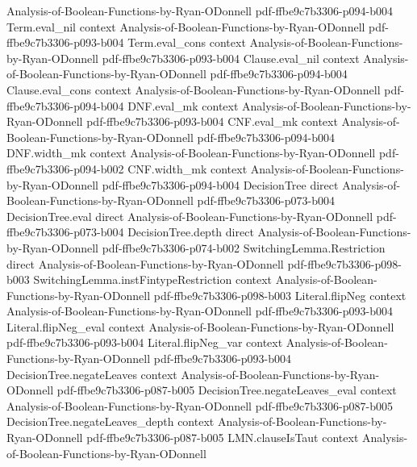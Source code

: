 \begin{lemma}
  {Analysis-of-Boolean-Functions-by-Ryan-ODonnell}
  {pdf-ffbe9c7b3306-p094-b004}
\proofstep
  {Term.eval_nil}
  {context}
  {Analysis-of-Boolean-Functions-by-Ryan-ODonnell}
  {pdf-ffbe9c7b3306-p093-b004}
\proofstep
  {Term.eval_cons}
  {context}
  {Analysis-of-Boolean-Functions-by-Ryan-ODonnell}
  {pdf-ffbe9c7b3306-p093-b004}
\proofstep
  {Clause.eval_nil}
  {context}
  {Analysis-of-Boolean-Functions-by-Ryan-ODonnell}
  {pdf-ffbe9c7b3306-p094-b004}
\proofstep
  {Clause.eval_cons}
  {context}
  {Analysis-of-Boolean-Functions-by-Ryan-ODonnell}
  {pdf-ffbe9c7b3306-p094-b004}
\proofstep
  {DNF.eval_mk}
  {context}
  {Analysis-of-Boolean-Functions-by-Ryan-ODonnell}
  {pdf-ffbe9c7b3306-p093-b004}
\proofstep
  {CNF.eval_mk}
  {context}
  {Analysis-of-Boolean-Functions-by-Ryan-ODonnell}
  {pdf-ffbe9c7b3306-p094-b004}
\proofstep
  {DNF.width_mk}
  {context}
  {Analysis-of-Boolean-Functions-by-Ryan-ODonnell}
  {pdf-ffbe9c7b3306-p094-b002}
\proofstep
  {CNF.width_mk}
  {context}
  {Analysis-of-Boolean-Functions-by-Ryan-ODonnell}
  {pdf-ffbe9c7b3306-p094-b004}
\proofstep
  {DecisionTree}
  {direct}
  {Analysis-of-Boolean-Functions-by-Ryan-ODonnell}
  {pdf-ffbe9c7b3306-p073-b004}
\proofstep
  {DecisionTree.eval}
  {direct}
  {Analysis-of-Boolean-Functions-by-Ryan-ODonnell}
  {pdf-ffbe9c7b3306-p073-b004}
\proofstep
  {DecisionTree.depth}
  {direct}
  {Analysis-of-Boolean-Functions-by-Ryan-ODonnell}
  {pdf-ffbe9c7b3306-p074-b002}
\proofstep
  {SwitchingLemma.Restriction}
  {direct}
  {Analysis-of-Boolean-Functions-by-Ryan-ODonnell}
  {pdf-ffbe9c7b3306-p098-b003}
\proofstep
  {SwitchingLemma.instFintypeRestriction}
  {context}
  {Analysis-of-Boolean-Functions-by-Ryan-ODonnell}
  {pdf-ffbe9c7b3306-p098-b003}
\proofstep
  {Literal.flipNeg}
  {context}
  {Analysis-of-Boolean-Functions-by-Ryan-ODonnell}
  {pdf-ffbe9c7b3306-p093-b004}
\proofstep
  {Literal.flipNeg_eval}
  {context}
  {Analysis-of-Boolean-Functions-by-Ryan-ODonnell}
  {pdf-ffbe9c7b3306-p093-b004}
\proofstep
  {Literal.flipNeg_var}
  {context}
  {Analysis-of-Boolean-Functions-by-Ryan-ODonnell}
  {pdf-ffbe9c7b3306-p093-b004}
\proofstep
  {DecisionTree.negateLeaves}
  {context}
  {Analysis-of-Boolean-Functions-by-Ryan-ODonnell}
  {pdf-ffbe9c7b3306-p087-b005}
\proofstep
  {DecisionTree.negateLeaves_eval}
  {context}
  {Analysis-of-Boolean-Functions-by-Ryan-ODonnell}
  {pdf-ffbe9c7b3306-p087-b005}
\proofstep
  {DecisionTree.negateLeaves_depth}
  {context}
  {Analysis-of-Boolean-Functions-by-Ryan-ODonnell}
  {pdf-ffbe9c7b3306-p087-b005}
\proofstep
  {LMN.clauseIsTaut}
  {context}
  {Analysis-of-Boolean-Functions-by-Ryan-ODonnell}

\end{lemma}
